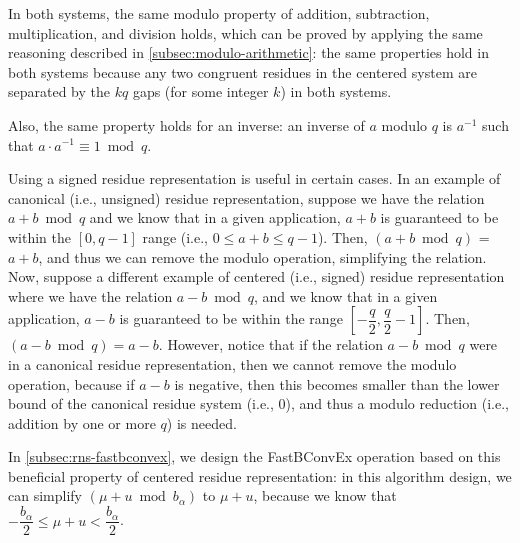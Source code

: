 In both systems, the same modulo property of addition, subtraction, multiplication, and division holds, which can be proved by applying the same reasoning described in \autoref{subsec:modulo-arithmetic}: the same properties hold in both systems because any two congruent residues in the centered system are separated by the $kq$ gaps (for some integer $k$) in both systems. 

Also, the same property holds for an inverse: an inverse of $a$ modulo $q$ is $a^{-1}$ such that $a \cdot a^{-1} \equiv 1 \bmod q$. 

Using a signed residue representation is useful in certain cases. In an example of canonical (i.e., unsigned) residue representation, suppose we have the relation $a + b \bmod q$ and we know that in a given application, $a + b$ is guaranteed to be within the $[0, q-1]$ range (i.e., $0 \leq a + b \leq q-1$). Then, $(a + b \bmod q)$ = $a + b$, and thus we can remove the modulo operation, simplifying the relation. Now, suppose a different example of centered (i.e., signed) residue representation where we have the relation $a - b \bmod q$, and we know that in a given application, $a - b$ is guaranteed to be within the range $\left[-\dfrac{q}{2}, \dfrac{q}{2} - 1\right]$. Then, $(a - b \bmod q) = a - b$. However, notice that if the relation $a - b \bmod q$ were in a canonical residue representation, then we cannot remove the modulo operation, because if $a - b$ is negative, then this becomes smaller than the lower bound of the canonical residue system (i.e., $0$), and thus a modulo reduction (i.e., addition by one or more $q$) is needed. 

In \autoref{subsec:rns-fastbconvex}, we design the \textsf{FastBConvEx} operation based on this beneficial property of centered residue representation: in this algorithm design, we can simplify $(\mu + u \bmod b_\alpha)$ to $\mu + u$, because we know that $-\dfrac{b_\alpha}{2} \leq \mu + u < \dfrac{b_\alpha}{2}$.
